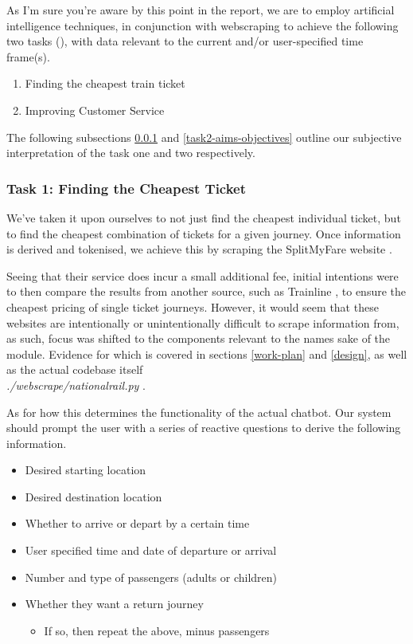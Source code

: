 \documentclass[11pt]{article}
\newcounter{subsubsubsection}[subsubsection]
\begin{document}
As I'm sure you're aware by this point in the report, we are to employ artificial intelligence techniques, in conjunction with webscraping to achieve the following two tasks (\cite{AI2018CW}), with data relevant to the current and/or user-specified time frame(s).

\begin{enumerate}
    \item Finding the cheapest train ticket
    \item Improving Customer Service
\end{enumerate}

The following subsections \ref{task1-aims-objectives} and \ref{task2-aims-objectives} outline our subjective interpretation of the task one and two respectively. 

\subsubsection{Task 1: Finding the Cheapest Ticket} \label{task1-aims-objectives}

We've taken it upon ourselves to not just find the cheapest individual ticket, but to find the cheapest combination of tickets for a given journey. Once information is derived and tokenised, we achieve this by scraping the SplitMyFare website \cite{splitmyfare}.

Seeing that their service does incur a small additional fee, initial intentions were to then compare the results from another source, such as Trainline \cite{trainline}, to ensure the cheapest pricing of single ticket journeys. However, it would seem that these websites are intentionally or unintentionally difficult to scrape information from, as such, focus was shifted to the components relevant to the names sake of the module. Evidence for which is covered in sections \ref{work-plan} and \ref{design}, as well as the actual codebase itself\\ \textit{./webscrape/nationalrail.py} \cite{repo}.

As for how this determines the functionality of the actual chatbot. Our system should prompt the user with a series of reactive questions to derive the following information.

\begin{itemize}
    \item Desired starting location
    \item Desired destination location
    \item Whether to arrive or depart by a certain time
    \item User specified time and date of departure or arrival
    \item Number and type of passengers (adults or children)
    \item Whether they want a return journey
        \begin{itemize} \item If so, then repeat the above, minus passengers \end{itemize}
\end{itemize}
\end{document}
